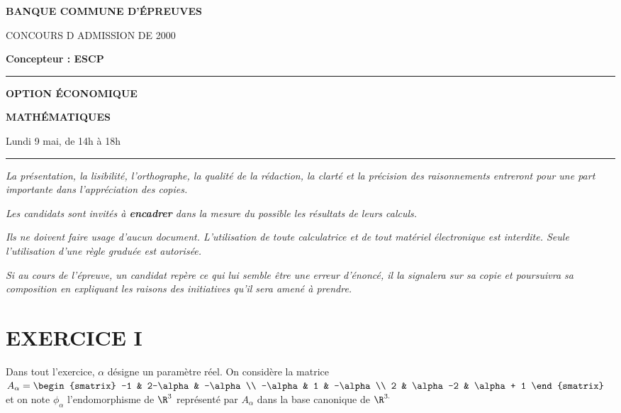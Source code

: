 \documentclass[11pt]{article}%
\begin{document}

\begin{center}
{\LARG\E\textbf{BANQUE COMMUNE D'ÉPREUVES}}



{\large \textsc{CONCOURS D ADMISSION DE 2000}}



{\large \textbf{Concepteur : ESCP}}



\rule{2.39cm}{0.05cm}



{\Large \textbf{OPTION ÉCONOMIQUE}}



{\Large \textbf{MATHÉMATIQUES }}



{\Large Lundi 9 mai, de 14h à 18h}



\rule{2.39cm}{0.05cm}
\end{center}

\textit{La présentation, la lisibilité, l'orthographe, la qualité
de la rédaction, la clarté et la précision des raisonnements
entreront pour une part importante dans l'appréciation des copies.}

\textit{Les candidats sont invités à \textbf{encadrer} dans la mesure
du possible les résultats de leurs calculs.}

\textit{Ils ne doivent faire usage d'aucun document. L'utilisation de
toute
calculatrice et de tout matériel électronique est interdite. Seule
l'utilisation d'une règle graduée est autorisée.}

\textit{Si au cours de l'épreuve, un candidat repère ce qui lui semble
être une erreur d'énoncé, il la signalera sur sa copie et
poursuivra sa composition en expliquant les raisons des initiatives
qu'il sera
amené à prendre.}

\vspace*{3cm}

\section*{EXERCICE I}

Dans tout l'exercice, $\alpha $ désigne un paramètre réel. On considère
la
matrice $A_{\alpha } = 
\begin{smatrix}
-1 & 2-\alpha & -\alpha \\
-\alpha & 1 & -\alpha \\
2 & \alpha -2 & \alpha + 1
\end{smatrix}
$ et on note $\phi_{\alpha }$ l'endomorphisme de $\R^{3}$ représenté
par $A_{\alpha }$ dans la base canonique de $\R^{3.}$
\end{document}
